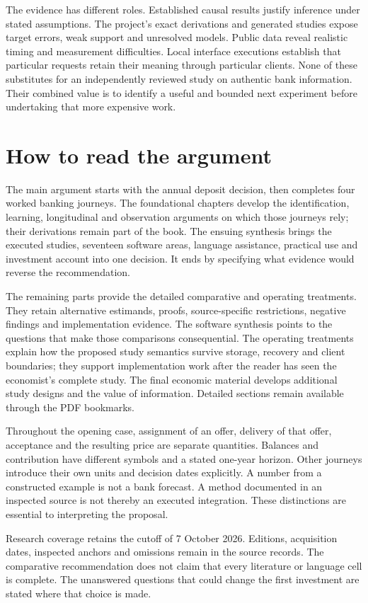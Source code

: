 The evidence has different roles. Established causal results justify inference
under stated assumptions. The project's exact derivations and generated studies
expose target errors, weak support and unresolved models. Public data reveal
realistic timing and measurement difficulties. Local interface executions
establish that particular requests retain their meaning through particular
clients. None of these substitutes for an independently reviewed study on
authentic bank information. Their combined value is to identify a useful and
bounded next experiment before undertaking that more expensive work.

\chapter*{How to read the argument}

The main argument starts with the annual deposit decision, then completes four
worked banking journeys. The foundational chapters develop the identification,
learning, longitudinal and observation arguments on which those journeys rely;
their derivations remain part of the book. The ensuing synthesis brings the
executed studies, seventeen software areas, language assistance, practical use
and investment account into one decision. It ends by specifying what evidence
would reverse the recommendation.

The remaining parts provide the detailed comparative and operating treatments.
They retain alternative estimands, proofs, source-specific restrictions,
negative findings and implementation evidence. The software synthesis points
to the questions that make those comparisons consequential. The operating
treatments explain how the proposed study semantics survive storage, recovery
and client boundaries; they support implementation work after the reader has
seen the economist's complete study. The final economic material develops
additional study designs and the value of information. Detailed sections remain
available through the PDF bookmarks.

Throughout the opening case, assignment of an offer, delivery of that offer,
acceptance and the resulting price are separate quantities. Balances and
contribution have different symbols and a stated one-year horizon. Other
journeys introduce their own units and decision dates explicitly. A number
from a constructed example is not a bank forecast. A method documented in an
inspected source is not thereby an executed integration. These distinctions
are essential to interpreting the proposal.

Research coverage retains the cutoff of 7 October 2026. Editions, acquisition
dates, inspected anchors and omissions remain in the source records. The
comparative recommendation does not claim that every literature or language
cell is complete. The unanswered questions that could change the first
investment are stated where that choice is made.
